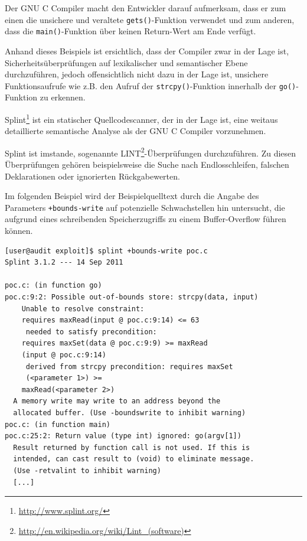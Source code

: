 Der GNU C Compiler macht den Entwickler darauf aufmerksam, dass er zum 
einen die unsichere und veraltete \texttt{gets()}-Funktion verwendet und 
zum anderen, dass die \texttt{main()}-Funktion über keinen Return-Wert am 
Ende verfügt.

Anhand dieses Beispiels ist ersichtlich, dass der Compiler zwar in der 
Lage ist, Sicherheitsüberprüfungen auf lexikalischer und semantischer 
Ebene durchzuführen, jedoch offensichtlich nicht dazu in der Lage ist, 
unsichere Funktionsaufrufe wie z.B. den Aufruf der \texttt{strcpy()}-Funktion 
innerhalb der \texttt{go()}-Funktion zu erkennen.


Splint\footnote{\url{http://www.splint.org/}} ist ein statischer Quellcodescanner, 
der in der Lage ist, eine weitaus detaillierte semantische Analyse als 
der GNU C Compiler vorzunehmen.

Splint ist imstande, sogenannte LINT\footnote{\url{http://en.wikipedia.org/wiki/Lint\_(software)}}-Überprüfungen 
durchzuführen. Zu diesen Überprüfungen gehören beispielsweise die Suche 
nach Endlosschleifen, falschen Deklarationen oder ignorierten Rückgabewerten.

Im folgenden Beispiel wird der Beispielquelltext durch die Angabe des 
Parameters \texttt{+bounds-write} auf potenzielle Schwachstellen hin 
untersucht, die aufgrund eines schreibenden Speicherzugriffs zu einem 
Buffer-Overflow führen können.

\begin{lstlisting}[basicstyle=\ttfamily\footnotesize]
[user@audit exploit]$ splint +bounds-write poc.c
Splint 3.1.2 --- 14 Sep 2011

poc.c: (in function go)
poc.c:9:2: Possible out-of-bounds store: strcpy(data, input)
    Unable to resolve constraint:
    requires maxRead(input @ poc.c:9:14) <= 63
     needed to satisfy precondition:
    requires maxSet(data @ poc.c:9:9) >= maxRead
    (input @ poc.c:9:14)
     derived from strcpy precondition: requires maxSet
     (<parameter 1>) >=
    maxRead(<parameter 2>)
  A memory write may write to an address beyond the 
  allocated buffer. (Use -boundswrite to inhibit warning)
poc.c: (in function main)
poc.c:25:2: Return value (type int) ignored: go(argv[1])
  Result returned by function call is not used. If this is 
  intended, can cast result to (void) to eliminate message. 
  (Use -retvalint to inhibit warning)
  [...]
\end{lstlisting}

